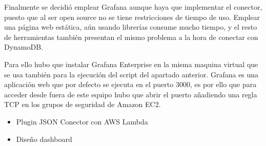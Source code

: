 Finalmente se decidió emplear Grafana aunque haya que implementar el conector, puesto que al ser open source no se tiene restricciones de tiempo de uso. Emplear una página web estática, aún usando librerías consume mucho tiempo, y el resto de herramientas también presentan el mismo problema a la hora de conectar con DynamoDB.

Para ello hubo que instalar Grafana Enterprise en la misma maquina virtual que se usa también para la ejecución del script del apartado anterior. Grafana es una aplicación web que por defecto se ejecuta en el puerto 3000, es por ello que para acceder desde fuera de este equipo hubo que abrir el puerto añadiendo una regla TCP en los grupos de seguridad de Amazon EC2.



\begin{itemize}
    \item Plugin JSON Conector con AWS Lambda
    \item Diseño dashboard
\end{itemize}
